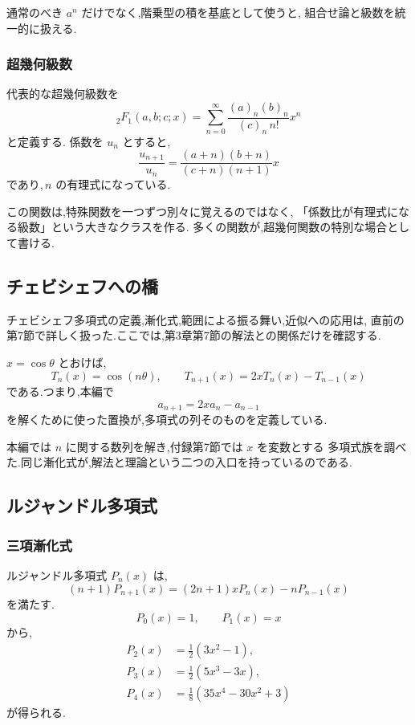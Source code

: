 通常のべき $a^n$ だけでなく,階乗型の積を基底として使うと,
組合せ論と級数を統一的に扱える.

\subsubsection{超幾何級数}

代表的な超幾何級数を
\[
  {}_2F_1(a,b;c;x)
  =
  \sum_{n=0}^{\infty}
  \frac{(a)_n(b)_n}{(c)_n\,n!}x^n
\]
と定義する.
係数を $u_n$ とすると,
\[
  \frac{u_{n+1}}{u_n}
  =
  \frac{(a+n)(b+n)}{(c+n)(n+1)}x
\]
であり,\,$n$ の有理式になっている.

この関数は,特殊関数を一つずつ別々に覚えるのではなく,
「係数比が有理式になる級数」という大きなクラスを作る.
多くの関数が,超幾何関数の特別な場合として書ける.

\subsection{チェビシェフへの橋}

チェビシェフ多項式の定義,漸化式,範囲による振る舞い,近似への応用は,
直前の第7節で詳しく扱った.ここでは,第3章第7節の解法との関係だけを確認する.

$x=\cos\theta$ とおけば,
\[
  T_n(x)=\cos(n\theta),
  \qquad
  T_{n+1}(x)=2xT_n(x)-T_{n-1}(x)
\]
である.つまり,本編で
\[
  a_{n+1}=2x a_n-a_{n-1}
\]
を解くために使った置換が,多項式の列そのものを定義している.

本編では $n$ に関する数列を解き,付録第7節では $x$ を変数とする
多項式族を調べた.同じ漸化式が,解法と理論という二つの入口を持っているのである.

\subsection{ルジャンドル多項式}

\subsubsection{三項漸化式}

ルジャンドル多項式 $P_n(x)$ は,
\[
  (n+1)P_{n+1}(x)
  =(2n+1)xP_n(x)-nP_{n-1}(x)
\]
を満たす.
\[
  P_0(x)=1,\qquad P_1(x)=x
\]
から,
\[
\begin{aligned}
  P_2(x)&=\frac12(3x^2-1),\\
  P_3(x)&=\frac12(5x^3-3x),\\
  P_4(x)&=\frac18(35x^4-30x^2+3)
\end{aligned}
\]
が得られる.

